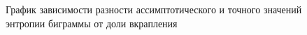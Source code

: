 ﻿\documentclass[a4paper,12pt]{article}
\theoremstyle{plain}
\begin{document}
			\begin{figure}[h]
				\caption{График зависимости разности ассимптотического и точного значений энтропии биграммы от доли вкрапления}
				\label{ris:"h2.png"}
			\end{figure}
		
\end{document}
